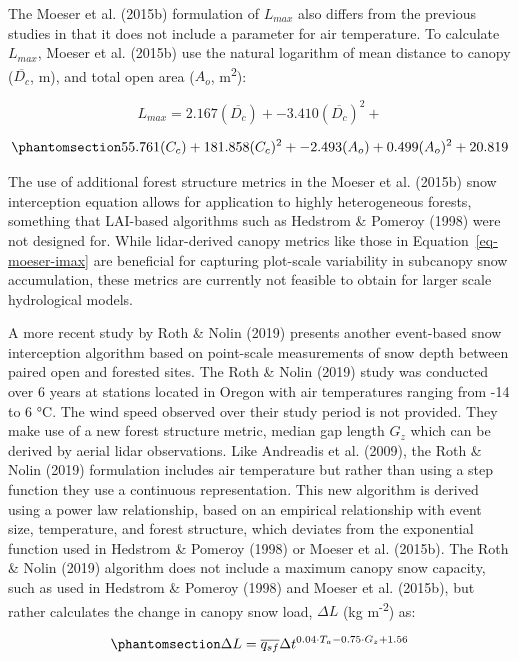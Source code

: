 \documentclass[
  letterpaper,
]{tex/uofsthesis-cs}
\begin{document}
The Moeser et al. (2015b) formulation of \(L_{max}\) also differs from
the previous studies in that it does not include a parameter for air
temperature. To calculate \(L_{max}\), Moeser et al. (2015b) use the
natural logarithm of mean distance to canopy (\(\overline{D_c}\), m),
and total open area (\(A_o\), m\textsuperscript{2}):

\[
L_{max} = 2.167(\overline{D_c}) + -3.410(\overline{D_c})^2 + 
\]

\begin{equation}\phantomsection\label{eq-moeser-imax}{
55.761(C_c) + 181.858(C_c)^2 + -2.493(A_o) + 0.499(A_o)^2 + 20.819
}\end{equation}

The use of additional forest structure metrics in the Moeser et al.
(2015b) snow interception equation allows for application to highly
heterogeneous forests, something that LAI-based algorithms such as
Hedstrom \& Pomeroy (1998) were not designed for. While lidar-derived
canopy metrics like those in Equation~\ref{eq-moeser-imax} are
beneficial for capturing plot-scale variability in subcanopy snow
accumulation, these metrics are currently not feasible to obtain for
larger scale hydrological models.

A more recent study by Roth \& Nolin (2019) presents another event-based
snow interception algorithm based on point-scale measurements of snow
depth between paired open and forested sites. The Roth \& Nolin (2019)
study was conducted over 6 years at stations located in Oregon with air
temperatures ranging from -14 to 6 °C. The wind speed observed over
their study period is not provided. They make use of a new forest
structure metric, median gap length \(G_z\) which can be derived by
aerial lidar observations. Like Andreadis et al. (2009), the Roth \&
Nolin (2019) formulation includes air temperature but rather than using
a step function they use a continuous representation. This new algorithm
is derived using a power law relationship, based on an empirical
relationship with event size, temperature, and forest structure, which
deviates from the exponential function used in Hedstrom \& Pomeroy
(1998) or Moeser et al. (2015b). The Roth \& Nolin (2019) algorithm does
not include a maximum canopy snow capacity, such as used in Hedstrom \&
Pomeroy (1998) and Moeser et al. (2015b), but rather calculates the
change in canopy snow load, \(\Delta L\) (kg m\textsuperscript{-2}) as:

\begin{equation}\phantomsection\label{eq-roth-i}{
\Delta L = \overline{q_{sf}} \Delta t ^{0.04 \cdot T_{a} - 0.75 \cdot G_z + 1.56}
}\end{equation}
\end{document}
